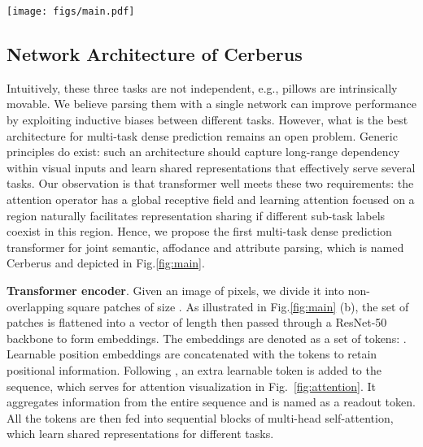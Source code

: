 \documentclass[10pt,twocolumn,letterpaper]{article}
\begin{document}
\begin{figure*}[t]
  \centering
  \texttt{[image: figs/main.pdf]}
  \caption{\textbf{Overall network architecture of Cerberus.} Given an image, ResNet-50 extract features from the input image to form a set of tokens. The tokens are processed by a transformer encoder and decoded by reassemble operations and fusion blocks. Through three prediction heads, the feature maps are turned into final attribute, affordance and semantic parsing results.}
  \label{fig:main} 
\end{figure*}

\subsection{Network Architecture of Cerberus}
Intuitively, these three tasks are not independent, e.g., pillows are intrinsically movable. We believe parsing them with a single network can improve performance by exploiting inductive biases between different tasks. However, what is the best architecture for multi-task dense prediction remains an open problem. Generic principles do exist: such an architecture should capture long-range dependency within visual inputs and learn shared representations that effectively serve several tasks. Our observation is that transformer well meets these two requirements: the attention operator has a global receptive field and learning attention focused on a region naturally facilitates representation sharing if different sub-task labels coexist in this region. Hence, we propose the first multi-task dense prediction transformer for joint semantic, affodance and attribute parsing, which is named Cerberus and depicted in Fig.\ref{fig:main}. 

\textbf{Transformer encoder}. Given an image of  pixels, we divide it into  non-overlapping square patches of size . As illustrated in Fig.\ref{fig:main} (b), the set of patches is flattened into a vector of length  then passed through a ResNet-50 backbone to form  embeddings. The embeddings are denoted as a set of tokens: . Learnable position embeddings are concatenated with the tokens to retain positional information. Following \cite{ranftl2021vision}, an extra learnable token  is added to the sequence, which serves for attention visualization in Fig.~\ref{fig:attention}. It aggregates information from the entire sequence and is named as a readout token. All the   tokens are then fed into sequential blocks of multi-head self-attention, which learn shared representations for different tasks.
\end{document}
